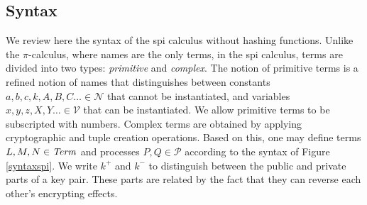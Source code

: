\documentclass[10pt,a4paper,final,oneside,fleqn]{book}
\begin{document}
\subsection{Syntax}
We review here the syntax of the spi calculus \cite{abadi1} without hashing functions.  Unlike the $\pi$-calculus, where names are the only terms, in the spi calculus, terms are divided into two types: {\itshape primitive\/} and {\itshape complex\/}.  The notion of primitive terms is a refined notion of names that distinguishes between constants $a,b,c,k,A,B,C\ldots\in\mathcal{N}$ that cannot be instantiated, and variables $x,y,z,X,Y\ldots\in\mathcal{V}$ that can be instantiated.  We allow primitive terms to be subscripted with numbers.  Complex terms are obtained by applying cryptographic and tuple creation operations.  Based on this, one may define terms $L,M,N\in\mbox{{\itshape Term\/}}$ and processes $P,Q\in\mathcal{P}$ according to the syntax of Figure \ref{syntaxspi}. We write $k^+$ and $k^-$ to distinguish between the public and private parts of a key pair.  These parts are related by the fact that they can reverse each other's encrypting effects.
\end{document}
